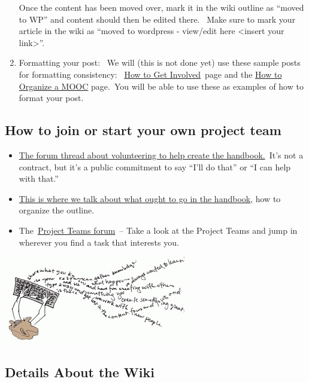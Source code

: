 \begin{enumerate}
  Once the content has been moved over, mark it in the wiki outline as
  ``moved to WP'' and content should then be edited there.~ Make sure to
  mark your article in the wiki as ``moved to wordpress - view/edit here
  \textless{}insert your link\textgreater{}''.
\item
  Formatting your post:~ We will (this is not done yet) use these sample
  posts for formatting consistency:
  ~\href{http://peeragogy.org/how-to-get-involved/}{How to Get
  Involved}~page and the
  \href{http://peeragogy.org/connectivism-in-practice-how-to-organize-a-mooc/}{How
  to Organize a MOOC} page.~You will be able to use these as examples of
  how to format your post.
\end{enumerate}

\subsection{How to join or start your own project team}

\begin{itemize}
\item
  \href{http://socialmediaclassroom.com/host/peeragogy/forum/teaming-signing-flesh-out-parts-outline}{The
  forum thread about volunteering to help create the handbook.}~It's not
  a contract, but it's a public commitment to say ``I'll do that'' or
  ``I can help with that.''
\item
  \href{http://socialmediaclassroom.com/host/peeragogy/forum/initial-rough-outline}{This
  is where we talk about what ought to go in the handbook}, how to
  organize the outline.
\item
  The~\href{http://socialmediaclassroom.com/host/peeragogy/forums/project-teams}{Project
  Teams forum}~-- Take a look at the Project Teams and jump in wherever
  you find a task that interests you.
\end{itemize}

\href{http://peeragogy.org/wp-content/uploads/2012/03/create\_content.gif}{\includegraphics{../pictures/create_content.jpg}}

\subsection{Details About the Wiki}

